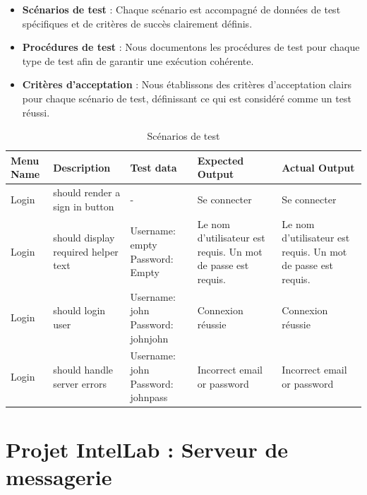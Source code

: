 \begin{itemize}
	\item \textbf{Scénarios de test} : Chaque scénario est accompagné de données de test spécifiques et de critères de succès clairement définis.
	\item \textbf{Procédures de test} : Nous documentons les procédures de test pour chaque type de test afin de garantir une exécution cohérente.
	\item \textbf{Critères d'acceptation} : Nous établissons des critères d'acceptation clairs pour chaque scénario de test, définissant ce qui est considéré comme un test réussi.
\end{itemize}

\begin{table}[h]
	\centering
	\begin{tabular}{|p{1.1cm}|p{3cm}|p{3cm}|p{4cm}|p{3cm}|}
		\hline
		\textbf{Menu Name} & \textbf{Description}                & \textbf{Test data}                & \textbf{Expected Output}                                     & \textbf{Actual Output}                                       \\ \hline
		Login              & should render a sign in button      & -                                 & Se connecter                                                 & Se connecter                                                 \\ \hline
		Login              & should display required helper text & Username: empty Password: Empty   & Le nom d'utilisateur est requis. Un mot de passe est requis. & Le nom d'utilisateur est requis. Un mot de passe est requis. \\ \hline
		Login              & should login user                   & Username: john Password: johnjohn & Connexion réussie                                            & Connexion réussie                                            \\ \hline
		Login              & should handle server errors         & Username: john Password: johnpass & Incorrect email or password                                  & Incorrect email or password                                  \\ \hline
	\end{tabular}
	\caption{Scénarios de test}
	\label{tab:test_scenarios}
\end{table}


\section{Projet IntelLab : Serveur de messagerie}

